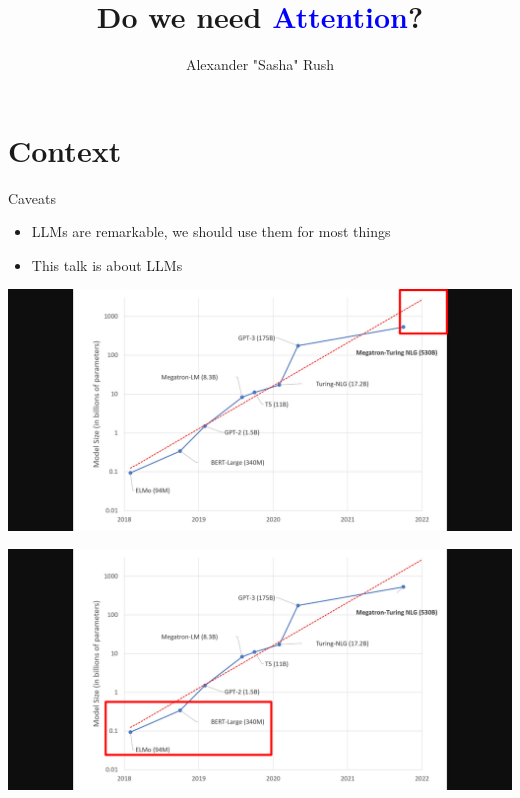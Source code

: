 \documentclass[14pt,aspectratio=169]{beamer}
\title{Do we need \textcolor{blue}{Attention}?}
\author{Alexander "Sasha" Rush}
\institute[shortinst]{}
\begin{document}
{
  \begin{frame}
    \titlepage
  \end{frame}
}

\begin{frame}[label=current]{}
    \cite{gu2022parameterization}
    \cite{}
    \cite{dao2022hungry}
    \cite{ma2022mega}
\end{frame}


\section{Context}


\begin{frame}[label=current]{Caveats}
    \begin{itemize}
        \item LLMs are remarkable, we should use them for most things
        \item This talk is  about LLMs 
    \end{itemize}
\end{frame}


\begin{frame}
    \includegraphics[trim={10cm 0 10cm 0}, clip, height=\textheight]{Figs/ModelSize2.png}
\end{frame}

\begin{frame}
    \includegraphics[trim={10cm 0 10cm 0}, clip, height=\textheight]{Figs/ModelSize3.png}
\end{frame}
\end{document}
